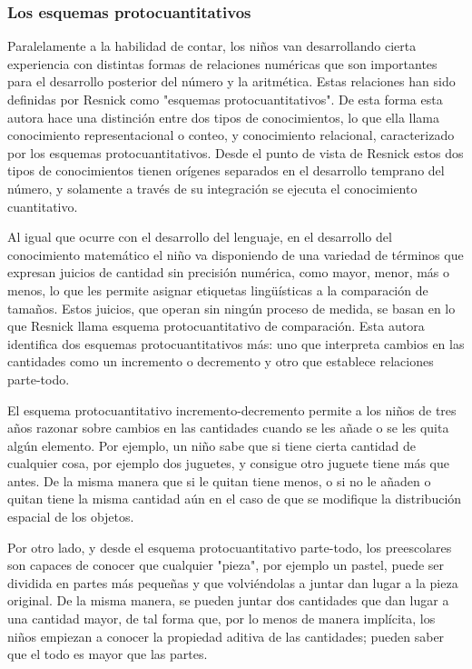 \documentclass{article}
\begin{document}
\subsubsection{Los esquemas protocuantitativos}
Paralelamente a la habilidad de contar, los niños van desarrollando cierta experiencia con distintas formas de relaciones numéricas que son importantes para el desarrollo posterior del número y la aritmética. Estas relaciones han sido definidas por Resnick \cite{resnick2020protoquantities,resnick1989developing} como "esquemas protocuantitativos". De esta forma esta autora hace una distinción entre dos tipos de conocimientos, lo que ella llama conocimiento representacional o conteo, y conocimiento relacional, caracterizado por los esquemas protocuantitativos. Desde el punto de vista de Resnick \cite{resnick2020protoquantities,resnick1989developing} estos dos tipos de conocimientos tienen orígenes separados en el desarrollo temprano del número, y solamente a través de su integración se ejecuta el conocimiento cuantitativo.

Al igual que ocurre con el desarrollo del lenguaje, en el desarrollo del conocimiento matemático el niño va disponiendo de una variedad de términos que expresan juicios de cantidad sin precisión numérica, como mayor, menor, más o menos, lo que les permite asignar etiquetas lingüísticas a la comparación de tamaños. Estos juicios, que operan sin ningún proceso de medida, se basan en lo que Resnick  \cite{resnick2020protoquantities,resnick1989developing} llama esquema protocuantitativo de comparación. Esta autora identifica dos esquemas protocuantitativos más: uno que interpreta cambios en las cantidades como un incremento o decremento y otro que establece relaciones parte-todo.

El esquema protocuantitativo incremento-decremento permite a los niños de tres años razonar sobre cambios en las cantidades cuando se les añade o se les quita algún elemento. Por ejemplo, un niño sabe que si tiene cierta cantidad de cualquier cosa, por ejemplo dos juguetes, y consigue otro juguete tiene más que antes. De la misma manera que si le quitan tiene menos, o si no le añaden o quitan tiene la misma cantidad aún en el caso de que se modifique la distribución espacial de los objetos.

Por otro lado, y desde el esquema protocuantitativo parte-todo, los preescolares son capaces de conocer que cualquier "pieza", por ejemplo un pastel, puede ser dividida en partes más pequeñas y que volviéndolas a juntar dan lugar a la pieza original. De la misma manera, se pueden juntar dos cantidades que dan lugar a una cantidad mayor, de tal forma que, por lo menos de manera implícita, los niños empiezan a conocer la propiedad aditiva de las cantidades; pueden saber que el todo es mayor que las partes.
\end{document}
